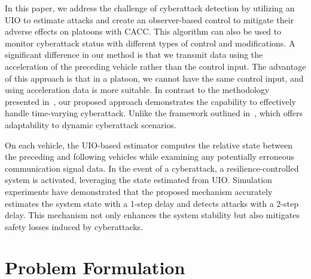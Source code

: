{%
In this paper, we address {the challenge of cyberattack detection} by utilizing an UIO to estimate attacks and create an observer-based control to mitigate their adverse effects on platoons with CACC. This algorithm can also be used to monitor cyberattack status with different types of control and modifications. A significant difference in our method is that we transmit data using the acceleration of the preceding vehicle rather than the control input. The advantage of this approach is that in a platoon, we cannot have the same control input, and using acceleration data is more {suitable}. {In contrast to the methodology presented in~\cite{simutal_PIO,DOS_attack_2023,jeon2020simultaneous}, our proposed approach demonstrates the capability to effectively handle time-varying cyberattack. Unlike the framework outlined in~\cite{simutal_PIO,DOS_attack_2023,jeon2020simultaneous}, which offers adaptability to dynamic cyberattack scenarios}.

On each vehicle, the UIO-based estimator computes the relative state between the preceding and following vehicles while examining any potentially erroneous communication signal data. In the event of a cyberattack, a resilience-controlled system is activated, leveraging the state estimated from UIO. Simulation experiments have demonstrated that the proposed mechanism accurately estimates the system state with a 1-step delay and detects attacks with a 2-step delay. This mechanism not only enhances the system stability but also mitigates safety losses induced by cyberattacks. %





\section{Problem Formulation}

}
